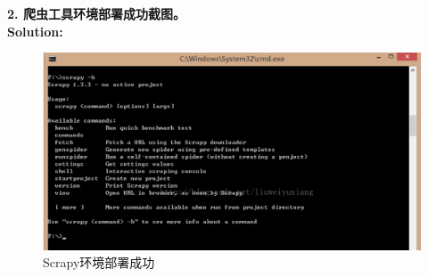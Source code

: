\documentclass{article}
\begin{document}
\begin{homeworkProblem}
	\textbf{2.	爬虫工具环境部署成功截图。}\\
	\textbf{Solution:}\\
	\begin{figure}[H]  %
		\centering
		\includegraphics[width=0.7\linewidth]{images/Fig1}
		\caption{Scrapy环境部署成功}
		\label{fig:ucas-logo}
	\end{figure}
	
\end{homeworkProblem}


\pagebreak
\end{document}
